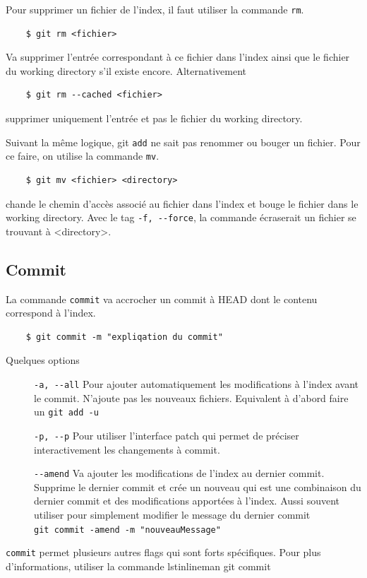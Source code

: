 \documentclass[a4paper, 12pt]{article}
\begin{document}
    Pour supprimer un fichier de l'index, il faut utiliser la commande
    \lstinline{rm}.

    \begin{lstlisting}
    $ git rm <fichier>
    \end{lstlisting}

    Va supprimer l'entrée correspondant à ce fichier dans l'index ainsi que
    le fichier du working directory s'il existe encore. Alternativement

    \begin{lstlisting}
    $ git rm --cached <fichier>
    \end{lstlisting}
    \noindent supprimer uniquement l'entrée et pas le fichier du working
    directory.

    Suivant la même logique, git \lstinline{add} ne sait pas renommer ou bouger
    un fichier.  Pour ce faire, on utilise la commande \lstinline{mv}.
    
    \begin{lstlisting}
    $ git mv <fichier> <directory>
    \end{lstlisting}
    
    \noindent chande le chemin d'accès associé au fichier dans l'index et bouge 
    le fichier dans le working directory. Avec le tag \lstinline{-f, --force},
    la commande écraserait un fichier se trouvant à <directory>.
    
    \subsection{Commit}
    La commande \lstinline{commit} va accrocher un commit à HEAD dont le
    contenu correspond à l'index.

    \begin{lstlisting}
    $ git commit -m "expliqation du commit"
    \end{lstlisting}

    Quelques options
    \begin{description}
        \item[] \lstinline{-a, --all} Pour ajouter automatiquement les
        modifications à l'index avant le commit. N'ajoute pas les nouveaux
        fichiers. Equivalent à d'abord faire un \lstinline{git add -u} 
        \item[] \lstinline{-p, --p} Pour utiliser l'interface patch qui permet
        de préciser interactivement les changements à commit.
        \item[] \lstinline{--amend} Va ajouter les modifications de l'index au
        dernier commit. Supprime le dernier commit et crée un nouveau qui
        est une combinaison du dernier commit et des modifications apportées à
        l'index. Aussi souvent utiliser pour simplement modifier le message du
        dernier commit \\
        \lstinline{git commit -amend -m "nouveauMessage"}
    \end{description}
    \lstinline{commit} permet plusieurs autres flags qui sont forts spécifiques.
    Pour plus d'informations, utiliser la commande lstinline{man git commit}
\end{document}
